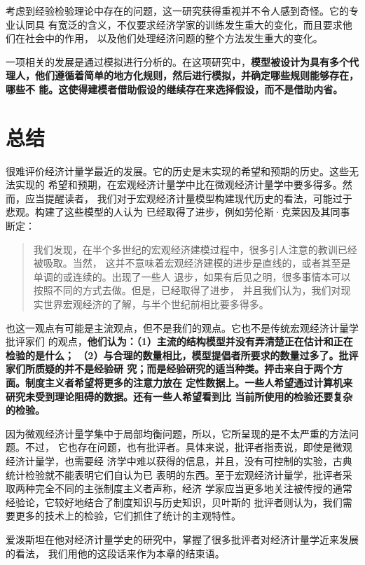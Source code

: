 考虑到经验检验理论中存在的问题，这一研究获得重视并不令人感到奇怪。它的专业认同具
有宽泛的含义，不仅要求经济学家的训练发生重大的变化，而且要求他们在社会中的作用，
以及他们处理经济问题的整个方法发生重大的变化。

一项相关的发展是通过模拟进行分析的。在这项研究中，\textbf{模型被设计为具有多个代
  理人，他们遵循着简单的地方化规则，然后进行模拟，并确定哪些规则能够存在，哪些不
  能。这使得建模者借助假设的继续存在来选择假设，而不是借助内省。}

\section{总结}

很难评价经济计量学最近的发展。它的历史是末实现的希望和预期的历史。这些无法实现的
希望和预期，在宏观经济计量学中比在微观经济计量学中要多得多。然而，应当提醒读者，
我们对于宏观经济计量模型构建现代历史的看法，可能过于悲观。构建了这些模型的人认为
已经取得了进步，例如劳伦斯·克莱因及其同事断定：

\begin{quotation}
  我们发现，在半个多世纪的宏观经济建模过程中，很多引人注意的教训已经被吸取。当然，
  这并不意味着宏观经济建模的进步是直线的，或者其至是单调的或连续的。出现了一些人
  退步，如果有后见之明，很多事情本可以按照不同的方式去做。但是，已经取得了进步，
  并且我们认为，我们对现实世界宏观经济的了解，与半个世纪前相比要多得多。
\end{quotation}

也这一观点有可能是主流观点，但不是我们的观点。它也不是传统宏观经济计量学批评家们
的观点，\textbf{他们认为：（1）主流的结构模型并没有弄清楚正在估计和正在检验的是什么；
（2）与合理的数量相比，模型提倡者所要求的数量过多了。批评家们所质疑的并不是经验研
究；而是经验研究的适当种类。抨击来自于两个方面。制度主义者希望将更多的注意力放在
定性数据上。一些人希望通过计算机来研究未受到理论阻碍的数据。还有一些人希望看到比
当前所使用的检验还要复杂的检验。}

因为微观经济计量学集中于局部均衡问题，所以，它所呈现的是不太严重的方法问题。不过，
它也存在问题，也有批评者。具体来说，批评者指责说，即使是微观经济计量学，也需要经
济学中难以获得的信息，并且，没有可控制的实验，古典统计检验就不能表明它们自认为已
表明的东西。至于宏观经济计量学，批评者采取两种完全不同的主张制度主义者声称，经济
学家应当更多地关注被传授的通常经验论，它较好地结合了制度知识与历史知识，贝叶斯的
批评者则认为，我们需要更多的技术上的检验，它们抓住了统计的主观特性。

爱泼斯坦在他对经济计量学史的研究中，掌握了很多批评者对经济计量学近来发展的看法，
我们用他的这段话来作为本章的结束语。

